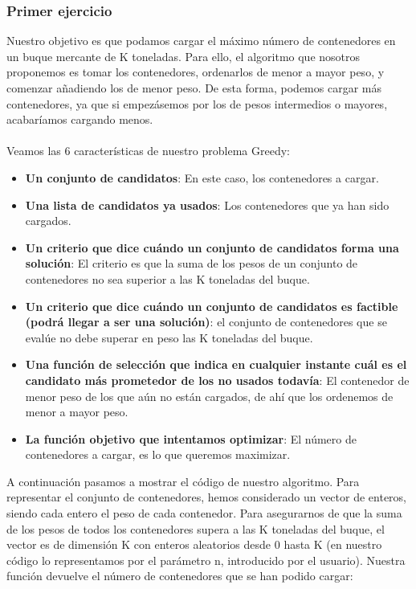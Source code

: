 \documentclass[10pt,a4paper]{article}
\begin{document}
\subsubsection{Primer ejercicio}
	Nuestro objetivo es que podamos cargar el máximo número de contenedores en un buque mercante de K toneladas. Para ello, el algoritmo que nosotros proponemos es tomar los contenedores, ordenarlos de menor a mayor peso, y comenzar añadiendo los de menor peso. De esta forma, podemos cargar más contenedores, ya que si empezásemos por los de pesos intermedios o mayores, acabaríamos cargando menos. 
	\\
	\\
	Veamos las 6 características de nuestro problema Greedy:
	\begin{itemize}
		\item \textbf{Un conjunto de candidatos}: En este caso, los contenedores a cargar.
		\item \textbf{Una lista de candidatos ya usados}: Los contenedores que ya han sido cargados.
		\item \textbf{Un criterio que dice cuándo un conjunto de candidatos forma una solución}: El criterio es que la suma de los pesos de un conjunto de contenedores no sea superior a las K toneladas del buque.
		\item \textbf{Un criterio que dice cuándo un conjunto de candidatos es factible (podrá llegar a ser una solución)}: el conjunto de contenedores que se evalúe no debe superar en peso las K toneladas del buque.
		\item \textbf{Una función de selección que indica en cualquier instante cuál es el candidato más prometedor de los no usados todavía}: El contenedor de menor peso de los que aún no están cargados, de ahí que los ordenemos de menor a mayor peso.
		\item \textbf{La función objetivo que intentamos optimizar}: El número de contenedores a cargar, es lo que queremos maximizar.
	\end{itemize}

	A continuación pasamos a mostrar el código de nuestro algoritmo. Para representar el conjunto de contenedores, hemos considerado un vector de enteros, siendo cada entero el peso de cada contenedor. Para asegurarnos de que la suma de los pesos de todos los contenedores supera a las K toneladas del buque, el vector es de dimensión K con enteros aleatorios desde 0 hasta K (en nuestro código lo representamos por el parámetro n, introducido por el usuario). Nuestra función devuelve el número de contenedores que se han podido cargar:
	
\end{document}
